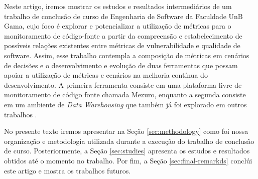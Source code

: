 Neste artigo, iremos mostrar os estudos e resultados intermediários de um trabalho de conclusão de curso de Engenharia de Software da Faculdade UnB Gama, cujo foco é explorar e potencializar a utilização de métricas para o monitoramento de código-fonte a partir da compreensão e estabelecimento de possíveis relações existentes entre métricas de vulnerabilidade e qualidade de software. Assim, esse trabalho contempla a composição de métricas em cenários de decisões e o desenvolvimento e evolução de duas ferramentas que possam apoiar a utilização de métricas e cenários na melhoria contínua do desenvolvimento. A primeira ferramenta consiste em uma plataforma livre de monitoramento de código fonte chamada Mezuro, enquanto a segunda consiste em um ambiente de \emph{Data Warehousing} que também já foi explorado em outros trabalhos \cite{Folleco2007}\cite{Silveira2010}\cite{mazuco2011}.

No presente texto iremos apresentar na Seção \ref{sec:methodology} como foi nossa organização e metodologia utilizada durante a execução do trabalho de conclusão de curso. Posteriormente, a Seção \ref{sec:studies} apresenta os estudos e resultados obtidos até o momento no trabalho. Por fim, a Seção \ref{sec:final-remarkds} conclúi este artigo e mostra os trabalhos futuros.
